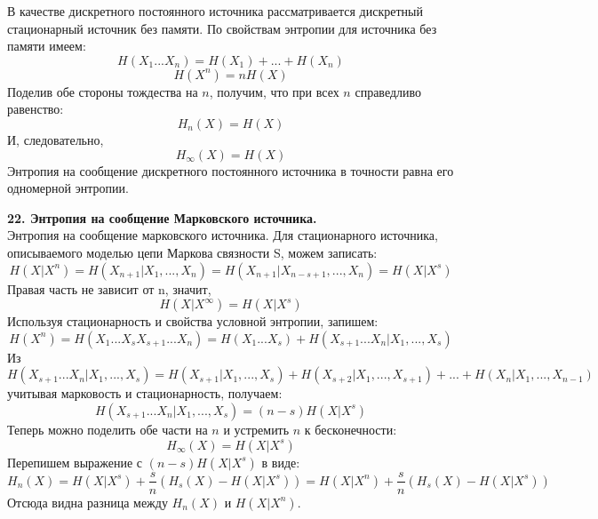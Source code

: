 \documentclass[14pt]{article}
\begin{document}
В качестве дискретного постоянного источника рассматривается дискретный стационарный источник без памяти. По свойствам энтропии для источника без памяти имеем: \\
\begin{displaymath}
    H(X_1...X_n) = H(X_1)+...+H(X_n)
\end{displaymath}
\begin{displaymath}
    H(X^n) = nH(X)
\end{displaymath}
Поделив обе стороны тождества на \(n\), получим, что при всех \(n\) справедливо равенство:
\begin{displaymath}
    H_n(X) = H(X)
\end{displaymath}
И, следовательно,
\begin{displaymath}
    H_{\infty}(X) = H(X)
\end{displaymath}
Энтропия на сообщение дискретного постоянного источника в точности равна его одномерной энтропии.

\bigskip
\textbf{22. Энтропия на сообщение Марковского источника.} \\

Энтропия на сообщение марковского источника. Для стационарного источника, описываемого моделью цепи Маркова связности S, можем записать: \\
\begin{displaymath}
    H(X|X^n) = H(X_{n+1}|X_1,...,X_n) = H(X_{n+1}|X_{n-s+1},...,X_n) = H(X|X^s)
\end{displaymath}
Правая часть не зависит от n, значит, \\
\begin{displaymath}
    H(X|X^{\infty}) = H(X|X^s)
\end{displaymath}
Используя стационарность и свойства условной энтропии, запишем: \\
\begin{displaymath}
    H(X^n) = H(X_1...X_sX_{s+1}...X_n) = H(X_1...X_s) + H(X_{s+1}...X_n|X_1,...,X_s)
\end{displaymath}
Из \\
\begin{displaymath}
    H(X_{s+1}...X_n|X_1,...,X_s) = H(X_{s+1}|X_1,...,X_s) + H(X_{s+2}|X_1,...,X_{s+1}) + ... + H(X_n|X_1,...,X_{n-1})
\end{displaymath}
учитывая марковость и стационарность, получаем: \\
\begin{displaymath}
    H(X_{s+1}...X_n|X_1,...,X_s) = (n - s)H(X|X^s)
\end{displaymath}
Теперь можно поделить обе части на \(n\) и устремить \(n\) к бесконечности: \\
\begin{displaymath}
    H_{\infty}(X) = H(X|X^s)
\end{displaymath}
Перепишем выражение с \((n - s)H(X|X^s)\) в виде: \\
\begin{displaymath}
    H_n(X) = H(X|X^s) + \frac{s}{n}(H_s(X) - H(X|X^s)) = H(X|X^n) + \frac{s}{n}(H_s(X) - H(X|X^s)) 
\end{displaymath}
Отсюда видна разница между \(H_n(X)\) и \(H(X|X^n)\).
\end{document}
